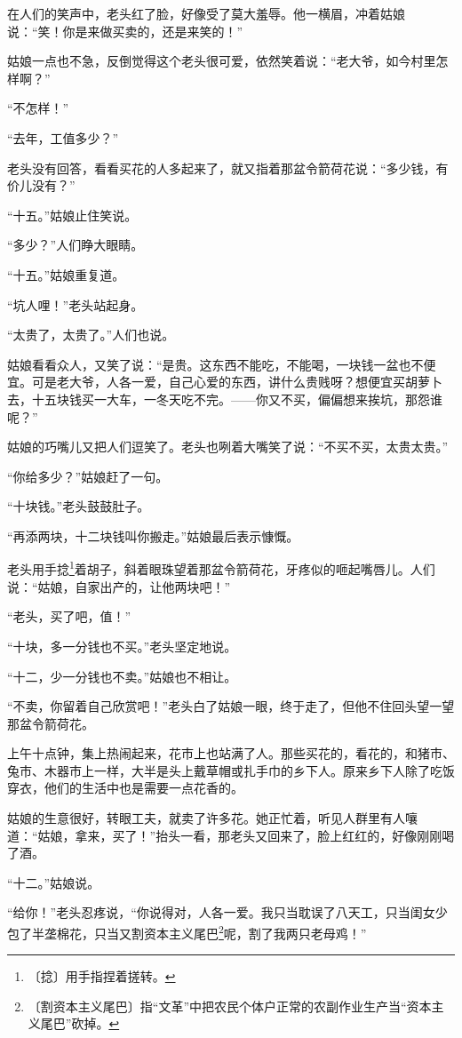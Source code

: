 \documentclass[12pt,UTF-8,openany]{ctexbook}
\begin{document}
\begin{normalsize}
    在人们的笑声中，老头红了脸，好像受了莫大羞辱。他一横眉，冲着姑娘说：“笑！你是来做买卖的，还是来笑的！”
    
    姑娘一点也不急，反倒觉得这个老头很可爱，依然笑着说：“老大爷，如今村里怎样啊？”
    
    “不怎样！”
    
    “去年，工值多少？”
    
    老头没有回答，看看买花的人多起来了，就又指着那盆令箭荷花说：“多少钱，有价儿没有？”
    
    “十五。”姑娘止住笑说。
    
    “多少？”人们睁大眼睛。
    
    “十五。”姑娘重复道。
    
    “坑人哩！”老头站起身。
    
    “太贵了，太贵了。”人们也说。
    
    姑娘看看众人，又笑了说：“是贵。这东西不能吃，不能喝，一块钱一盆也不便宜。可是老大爷，人各一爱，自己心爱的东西，讲什么贵贱呀？想便宜买胡萝卜去，十五块钱买一大车，一冬天吃不完。——你又不买，偏偏想来挨坑，那怨谁呢？”
    
    姑娘的巧嘴儿又把人们逗笑了。老头也咧着大嘴笑了说：“不买不买，太贵太贵。”
    
    “你给多少？”姑娘赶了一句。
    
    “十块钱。”老头鼓鼓肚子。
    
    “再添两块，十二块钱叫你搬走。”姑娘最后表示慷慨。
    
    老头用手捻\footnote{〔捻〕用手指捏着搓转。}着胡子，斜着眼珠望着那盆令箭荷花，牙疼似的咂起嘴唇儿。人们说：“姑娘，自家出产的，让他两块吧！”
    
    “老头，买了吧，值！”
    
    “十块，多一分钱也不买。”老头坚定地说。
    
    “十二，少一分钱也不卖。”姑娘也不相让。
    
    “不卖，你留着自己欣赏吧！”老头白了姑娘一眼，终于走了，但他不住回头望一望那盆令箭荷花。
    
    上午十点钟，集上热闹起来，花市上也站满了人。那些买花的，看花的，和猪市、兔市、木器市上一样，大半是头上戴草帽或扎手巾的乡下人。原来乡下人除了吃饭穿衣，他们的生活中也是需要一点花香的。
    
    姑娘的生意很好，转眼工夫，就卖了许多花。她正忙着，听见人群里有人嚷道：“姑娘，拿来，买了！”抬头一看，那老头又回来了，脸上红红的，好像刚刚喝了酒。
    
    “十二。”姑娘说。
    
    “给你！”老头忍疼说，“你说得对，人各一爱。我只当耽误了八天工，只当闺女少包了半垄棉花，只当又割资本主义尾巴\footnote{〔割资本主义尾巴〕指“文革”中把农民个体户正常的农副作业生产当“资本主义尾巴”砍掉。}呢，割了我两只老母鸡！”
    

\end{normalsize}
\end{document}

